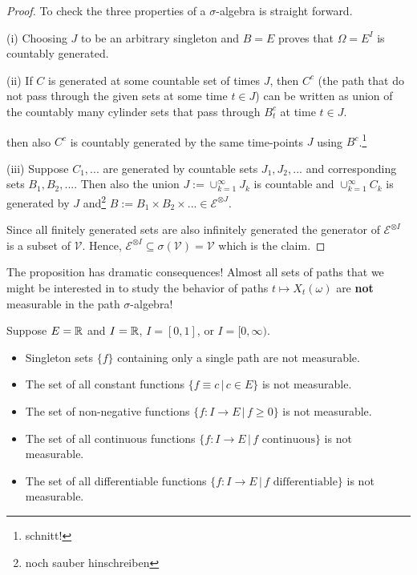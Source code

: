 \begin{proof}[Proof]
	To check the three properties of a $\sigma$-algebra is straight forward.\smallskip

	(i) Choosing $J$ to be an arbitrary singleton and $B=E$ proves that $\Omega=E^I$ is countably generated.\smallskip
	
	(ii) If $C$ is generated at some countable set of times $J$, then $C^c$ (the path that do not pass through the given sets at some time $t\in J$) can be written as union of the countably many cylinder sets that pass through $B_t^c$ at time $t\in J$.
	
	
	
	then also $C^c$ is countably generated by the same time-points $J$ using $B^c$.\footnote{schnitt!}\smallskip

	(iii) Suppose $C_1,...$ are generated by countable sets $J_1, J_2,...$ and corresponding sets $B_1,B_2,...$. Then also the union $J:=\cup_{k=1}^\infty J_k$ is countable and $\cup_{k=1}^\infty C_k$ is generated by $J$ and\footnote{noch sauber hinschreiben} $B:=B_1\times B_2\times ... \in \mathcal E^{\otimes J}$.\smallskip 

	Since all finitely generated sets are also infinitely generated the generator of $\mathcal E^{\otimes I}$ is a subset of $\mathcal V$. Hence, $\mathcal E^{\otimes I}\subseteq \sigma(\mathcal V)=\mathcal V$ which is the claim.
\end{proof}
The proposition has dramatic consequences! Almost all sets of paths that we might be interested in to study the behavior of paths $t\mapsto X_t(\omega)$ are \textbf{not} measurable in the path $\sigma$-algebra!
\begin{example}
	Suppose $E=\mathbb{R}$ and $I=\mathbb{R}$, $I=[0,1]$, or $I=[0,\infty)$. 
	\begin{itemize}
	\item Singleton sets $\{f\}$ containing only a single path are not measurable.
	\item The set of all constant functions $\{f\equiv c\,|\,c\in E\}$ is not measurable.
	\item The set of non-negative functions $\{ f:I\to E\,|\, f\geq 0\}$ is not measurable.
	\item The set of all continuous functions $\{f:I\to E\,|\, f\text{ continuous}\}$ is not measurable.
	\item  The set of all differentiable functions $\{f:I\to E\,|\, f\text{ differentiable}\}$ is not measurable.
	\end{itemize}
\end{example}
